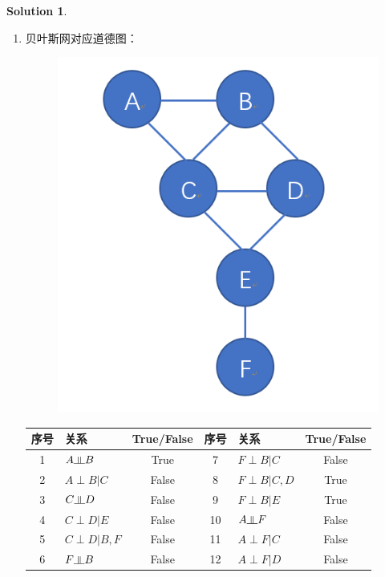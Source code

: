 \documentclass[a4paper,UTF8]{article}
\theoremstyle{definition}
\newtheorem*{solution}{Solution}
\newcommand{\indep}{\rotatebox[origin=c]{90}{$\models$}}
\begin{document}
\begin{solution}
\begin{enumerate}[(1)]
		\item 
		贝叶斯网对应道德图：
		\begin{figure}[h]
			\centering
			\includegraphics[scale=0.3]{moral.png}
		\end{figure}
		\begin{table}[h]
			\centering
			\begin{tabular}{c|l|c||c|l|c}\hline
				序号   		& 		关系  			& True/False 	& 序号   	& 		关系  			& True/False \\ \hline
				1			&	$A \indep B$ 		    & True			    & 7  		& 	$F \perp B|C$ 		& False			 \\
				2			&	$A \perp B|C$ 	    & False			    & 8  		& 	$F \perp B|C, D$ 	& True			 \\
				3			&	$C \indep D $		    & False			    & 9  		& 	$F \perp B|E$ 		& True			 \\
				4			&	$C \perp D|E$ 	    & False			    & 10  		& 	$A \indep F $			& False			 \\
				5			&	$C \perp D|B, F$     & False			    & 11  		& 	$A \perp F|C$ 		& False			 \\
				6			&	$F \indep B $		    & False			    & 12  		& 	$A \perp F|D$ 		& False			 \\ \hline
			\end{tabular}
		\end{table}
	\end{enumerate}
\end{solution}
\end{document}
